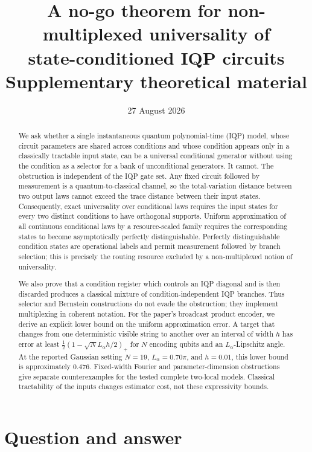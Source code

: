 \documentclass[11pt]{article}
\title{A no-go theorem for non-multiplexed universality of\\
state-conditioned IQP circuits\\[2mm]
\large Supplementary theoretical material}
\author{}
\date{27 August 2026}
\theoremstyle{definition}
\theoremstyle{remark}
\begin{document}
\maketitle

\begin{abstract}
We ask whether a single instantaneous quantum polynomial-time (IQP) model,
whose circuit parameters are shared across conditions and whose condition
appears only in a classically tractable input state, can be a universal
conditional generator without using the condition as a selector for a bank of
unconditional generators.  It cannot.  The obstruction is independent of the
IQP gate set.  Any fixed circuit followed by measurement is a
quantum-to-classical channel, so the total-variation distance between two
output laws cannot exceed the trace distance between their input states.
Consequently, exact universality over conditional laws requires the input
states for every two distinct conditions to have orthogonal supports.  Uniform
approximation of all continuous conditional laws by a resource-scaled family
requires the corresponding states to become asymptotically perfectly
distinguishable.  Perfectly distinguishable condition states are operational
labels and permit measurement followed by branch selection; this is precisely
the routing resource excluded by a non-multiplexed notion of universality.

We also prove that a condition register which controls an IQP diagonal and is
then discarded produces a classical mixture of condition-independent IQP
branches.  Thus selector and Bernstein constructions do not evade the
obstruction; they implement multiplexing in coherent notation.  For the
paper's broadcast product encoder, we derive an explicit lower bound on the
uniform approximation error.  A target that changes from one deterministic
visible string to another over an interval of width $h$ has error at least
$\tfrac12(1-\sqrt{N}L_\alpha h/2)_+$ for $N$ encoding qubits and an
$L_\alpha$-Lipschitz angle.  At the reported Gaussian setting
$N=19$, $L_\alpha=0.70\pi$, and $h=0.01$, this lower bound is approximately
$0.476$.  Fixed-width Fourier and parameter-dimension obstructions give
separate counterexamples for the tested complete two-local models.  Classical
tractability of the inputs changes estimator cost, not these expressivity
bounds.
\end{abstract}

\section{Question and answer}
\label{sec:answer}
\end{document}
